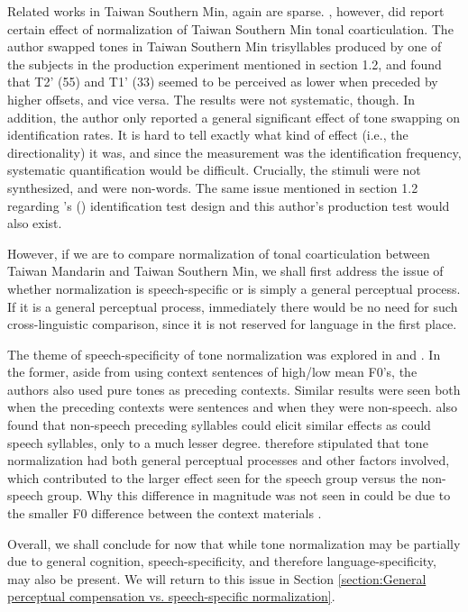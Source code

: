 Related works in Taiwan Southern Min, again are sparse. \cite{Wang2002}, however, did report certain effect of normalization of Taiwan Southern Min tonal coarticulation. The author swapped tones in Taiwan Southern Min trisyllables produced by one of the subjects in the production experiment mentioned in section 1.2, and found that T2' (55) and T1' (33) seemed to be perceived as lower when preceded by higher offsets, and vice versa. The results were not systematic, though. In addition, the author only reported a general significant effect of tone swapping on identification rates. It is hard to tell exactly what kind of effect (i.e., the directionality) it was, and since the measurement was the identification frequency, systematic quantification would be difficult. Crucially, the stimuli were not synthesized, and were non-words. The same issue mentioned in section 1.2 regarding \citeauthor{Peng1997}'s (\citeyear{Peng1997}) identification test design and this author's production test would also exist.

However, if we are to compare normalization of tonal coarticulation between Taiwan Mandarin and Taiwan Southern Min, we shall first address the issue of whether normalization is speech-specific or is simply a general perceptual process. If it is a general perceptual process, immediately there would be no need for such cross-linguistic comparison, since it is not reserved for language in the first place.

The theme of speech-specificity of tone normalization was explored in \cite{HuangHolt2009} and \cite{Zhangetal2022}. In the former, aside from using context sentences of high/low mean F0's, the authors also used pure tones as preceding contexts. Similar results were seen both when the preceding contexts were sentences and when they were non-speech. \cite{Zhangetal2022} also found that non-speech preceding syllables could elicit similar effects as could speech syllables, only to a much lesser degree. \cite{Zhangetal2022} therefore stipulated that tone normalization had both general perceptual processes and other factors involved, which contributed to the larger effect seen for the speech group versus the non-speech group. Why this difference in magnitude was not seen in \cite{HuangHolt2009} could be due to the smaller F0 difference between the context materials \citep{Zhangetal2022}.

Overall, we shall conclude for now that while tone normalization may be partially due to general cognition, speech-specificity, and therefore language-specificity, may also be present. We will return to this issue in Section \ref{section:General perceptual compensation vs. speech-specific normalization}.

